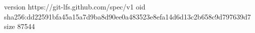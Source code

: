 version https://git-lfs.github.com/spec/v1
oid sha256:dd22591bfa45a15a7d9ba8d90ee0a483523e8efa14d6d13c2b658c9d797639d7
size 87544
